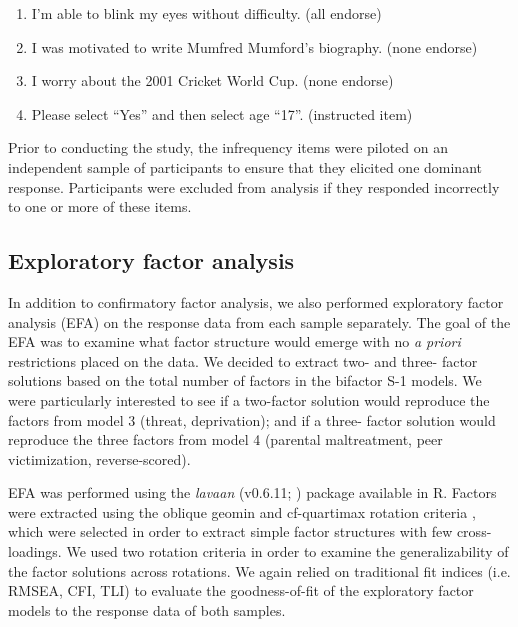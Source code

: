 \documentclass[letterpaper,man,natbib,noextraspace,floatsintext,longtable,12pt]{apa6}
\begin{document}
\begin{enumerate}
    \item I'm able to blink my eyes without difficulty. (all endorse)
    \item I was motivated to write Mumfred Mumford's biography. (none endorse)
    \item I worry about the 2001 Cricket World Cup. (none endorse)
    \item Please select ``Yes'' and then select age ``17''. (instructed item)
\end{enumerate}

\noindent Prior to conducting the study, the infrequency items were piloted on an independent sample of participants to ensure that they elicited one dominant response. Participants were excluded from analysis if they responded incorrectly to one or more of these items.

\subsection{Exploratory factor analysis}

In addition to confirmatory factor analysis, we also performed exploratory factor analysis (EFA) on the response data from each sample separately. The goal of the EFA was to examine what factor structure would emerge with no \emph{a priori} restrictions placed on the data. We decided to extract two- and three- factor solutions based on the total number of factors in the bifactor S-1 models. We were particularly interested to see if a two-factor solution would reproduce the factors from model 3 (threat, deprivation); and if a three- factor solution would reproduce the three factors from model 4 (parental maltreatment, peer victimization, reverse-scored). 

EFA was performed using the \textit{lavaan} (v0.6.11; \citealt{lavaan}) package available in R. Factors were extracted using the oblique geomin \citep{yates1987multivariate} and cf-quartimax rotation criteria \citep{crawford1970general}, which were selected in order to extract simple factor structures with few cross-loadings. We used two rotation criteria in order to examine the generalizability of the factor solutions across rotations. We again relied on traditional fit indices (i.e. RMSEA, CFI, TLI) to evaluate the goodness-of-fit of the exploratory factor models to the response data of both samples.
\end{document}
